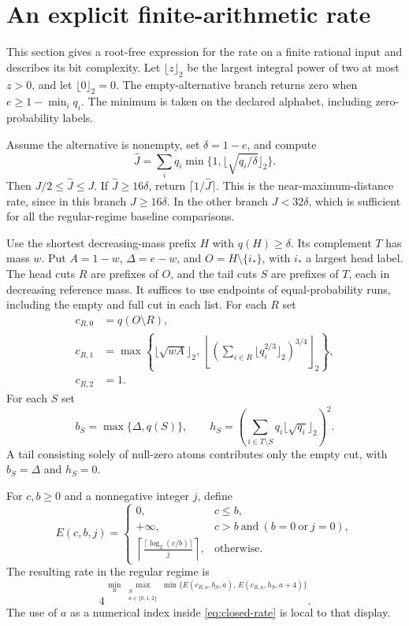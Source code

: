 \section{An explicit finite-arithmetic rate}
\label{sec:closed-rate}

This section gives a root-free expression for the rate on a finite
rational input and describes its bit complexity. Let
\(\lfloor z\rfloor_2\) be the largest integral power of two at most
\(z>0\), and let \(\lfloor0\rfloor_2=0\). The empty-alternative branch
returns zero when \(e\ge1-\min_iq_i\). The minimum is taken on the
declared alphabet, including zero-probability labels.

Assume the alternative is nonempty, set \(\delta=1-e\), and compute
\[
  \widehat J=\sum_i q_i\min\{1,\lfloor\sqrt{q_i/\delta}\rfloor_2\}.
\]
Then \(J/2\le\widehat J\le J\). If \(\widehat J\ge16\delta\), return
\(\lceil1/\widehat J\rceil\). This is the near-maximum-distance
rate, since in this branch \(J\ge16\delta\). In the other branch
\(J<32\delta\), which is sufficient for all the regular-regime
baseline comparisons.

Use the shortest decreasing-mass prefix \(H\) with \(q(H)\ge\delta\).
Its complement \(T\) has mass \(w\). Put \(A=1-w\), \(\Delta=e-w\),
and \(O=H\setminus\{i_*\}\), with \(i_*\) a largest head label.
The head cuts \(R\) are prefixes of \(O\), and the tail cuts \(S\) are
prefixes of \(T\), each in decreasing reference mass. It suffices
to use endpoints of equal-probability runs, including the empty
and full cut in each list. For each \(R\) set
\[
 \begin{split}
 c_{R,0}&=q(O\setminus R),\\
 c_{R,1}&=\max\left\{\lfloor\sqrt{wA}\rfloor_2,\
       \left\lfloor
          \left(\sum_{i\in R}\lfloor q_i^{2/3}\rfloor_2\right)^{3/4}
       \right\rfloor_2\right\},\\
 c_{R,2}&=1.
 \end{split}
\]
For each \(S\) set
\[
 b_S=\max\{\Delta,q(S)\},\qquad
 h_S=\left(\sum_{i\in T\setminus S}q_i\lfloor\sqrt{q_i}\rfloor_2\right)^2 .
\]
A tail consisting solely of null-zero atoms contributes only the
empty cut, with \(b_S=\Delta\) and \(h_S=0\).

For \(c,b\ge0\) and a nonnegative integer \(j\), define
\[
 E(c,b,j)=
 \begin{cases}
 0,&c\le b,\\
 +\infty,&c>b\ \text{and}\ (b=0\ \text{or}\ j=0),\\
 \displaystyle\left\lceil\frac{\lceil\log_2(c/b)\rceil}{j}\right\rceil,
   &\text{otherwise}.
 \end{cases}
\]
The resulting rate in the regular regime is
\begin{equation}
 4^{\,\displaystyle\min_R\,
       \max_{\substack{S\\ a\in\{0,1,2\}}}
       \min\{E(c_{R,a},b_S,a),\,E(c_{R,a},h_S,a+4)\}} .
 \label{eq:closed-rate}
\end{equation}
The use of \(a\) as a numerical index inside \eqref{eq:closed-rate}
is local to that display.

